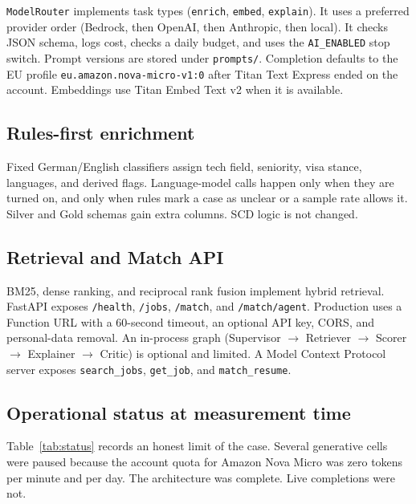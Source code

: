 \texttt{ModelRouter} implements task types (\texttt{enrich}, \texttt{embed}, \texttt{explain}). It uses a preferred provider order (Bedrock, then OpenAI, then Anthropic, then local). It checks JSON schema, logs cost, checks a daily budget, and uses the \texttt{AI\_ENABLED} stop switch. Prompt versions are stored under \texttt{prompts/}. Completion defaults to the EU profile \texttt{eu.amazon.nova-micro-v1:0} after Titan Text Express ended on the account. Embeddings use Titan Embed Text v2 when it is available.

\subsection{Rules-first enrichment}

Fixed German/English classifiers assign tech field, seniority, visa stance, languages, and derived flags. Language-model calls happen only when they are turned on, and only when rules mark a case as unclear or a sample rate allows it. Silver and Gold schemas gain extra columns. SCD logic is not changed.

\subsection{Retrieval and Match API}

BM25, dense ranking, and reciprocal rank fusion implement hybrid retrieval. FastAPI exposes \texttt{/health}, \texttt{/jobs}, \texttt{/match}, and \texttt{/match/agent}. Production uses a Function URL with a 60-second timeout, an optional API key, CORS, and personal-data removal. An in-process graph (Supervisor $\rightarrow$ Retriever $\rightarrow$ Scorer $\rightarrow$ Explainer $\rightarrow$ Critic) is optional and limited. A Model Context Protocol server exposes \texttt{search\_jobs}, \texttt{get\_job}, and \texttt{match\_resume}.

\subsection{Operational status at measurement time}

Table~\ref{tab:status} records an honest limit of the case. Several generative cells were paused because the account quota for Amazon Nova Micro was zero tokens per minute and per day. The architecture was complete. Live completions were not.

